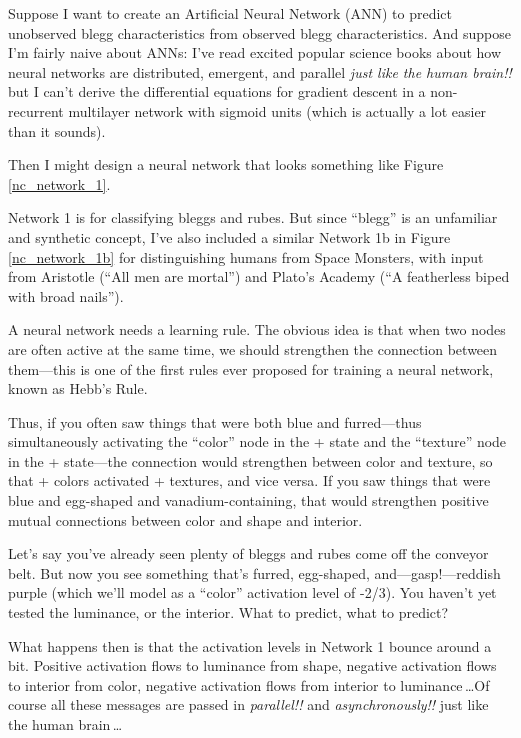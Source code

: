 { Suppose I want to create an Artificial Neural Network (ANN) to
predict unobserved blegg characteristics from observed blegg
characteristics. And suppose I'm fairly naive about
ANNs: I've read excited popular science books about how
neural networks are distributed, emergent, and parallel \textit{just
like the human brain!!} but I can't derive the
differential equations for gradient descent in a non-recurrent
multilayer network with sigmoid units (which is actually a lot easier
than it sounds).


 Then I might design a neural network that looks something like
Figure \ref{nc_network_1}.



 Network 1 is for classifying bleggs and rubes. But since
``blegg'' is an unfamiliar and
synthetic concept, I've also included a similar Network
1b in Figure \ref{nc_network_1b} for distinguishing humans from Space Monsters, with
input from Aristotle (``All men are
mortal'') and Plato's Academy
(``A featherless biped with broad
nails'').



 A neural network needs a learning rule. The obvious idea is that
when two nodes are often active at the same time, we should strengthen
the connection between them---this is one of the first rules ever
proposed for training a neural network, known as Hebb's
Rule.


 Thus, if you often saw things that were both blue and
furred---thus simultaneously activating the
``color'' node in the + state and
the ``texture'' node in the +
state---the connection would strengthen between color and texture, so
that + colors activated + textures, and vice versa. If you saw things
that were blue and egg-shaped and vanadium-containing, that would
strengthen positive mutual connections between color and shape and
interior.


 Let's say you've already seen
plenty of bleggs and rubes come off the conveyor belt. But now you see
something that's furred, egg-shaped,
and---gasp!---reddish purple (which we'll model as a
``color'' activation level of -2/3).
You haven't yet tested the luminance, or the interior.
What to predict, what to predict?


 What happens then is that the activation levels in Network 1
bounce around a bit. Positive activation flows to luminance from shape,
negative activation flows to interior from color, negative activation
flows from interior to luminance\,\ldots Of course all these messages are
passed in \textit{parallel!!} and \textit{asynchronously!!} just like
the human brain\,\ldots


}
